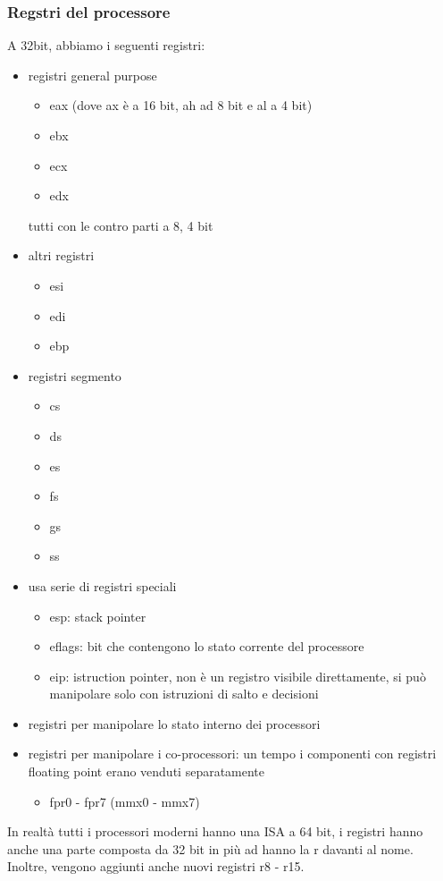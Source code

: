 \documentclass[12pt, oneside]{extbook}
\begin{document}
\subsubsection{Regstri del processore}
A 32bit, abbiamo i seguenti registri:
\begin{itemize}
\item registri general purpose
\begin{itemize}
\item eax (dove ax è a 16 bit, ah ad 8 bit e al a 4 bit)
\item ebx
\item ecx
\item edx
\end{itemize}
tutti con le contro parti a 8, 4 bit
\item altri registri
\begin{itemize}
\item esi
\item edi
\item ebp
\end{itemize}
\item registri segmento
\begin{itemize}
\item cs
\item ds
\item es
\item fs
\item gs
\item ss
\end{itemize}
\item usa serie di registri speciali
\begin{itemize}
\item esp: stack pointer
\item eflags: bit che contengono lo stato corrente del processore
\item eip: istruction pointer, non è un registro visibile direttamente, si può manipolare solo con istruzioni di salto e decisioni
\end{itemize}
\item registri per manipolare lo stato interno dei processori
\item registri per manipolare i co-processori: un tempo i componenti con registri floating point erano venduti separatamente
\begin{itemize}
\item fpr0 - fpr7 (mmx0 - mmx7)
\end{itemize}
\end{itemize} 
In realtà tutti i processori moderni hanno una ISA a 64 bit, i registri hanno anche una parte composta da 32 bit in più ad hanno la r davanti al nome. Inoltre, vengono aggiunti anche nuovi registri r8 - r15.
\end{document}
